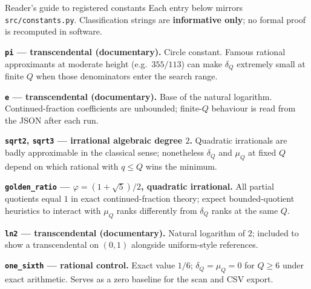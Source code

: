 \documentclass[
  ignorenonframetext,
]{beamer}
\author{\texorpdfstring{}{}}
\date{}
\begin{document}
\begin{frame}[fragile]{Reader's guide to registered constants}
\protect{}\label{readers-guide-to-registered-constants}
Each entry below mirrors \texttt{src/constants.py}. Classification
strings are \textbf{informative only}; no formal proof is recomputed in
software.

\textbf{\texttt{pi} --- transcendental (documentary).} Circle constant.
Famous rational approximants at moderate height (e.g.~\(355/113\)) can
make \(\delta_Q\) extremely small at finite \(Q\) when those
denominators enter the search range.

\textbf{\texttt{e} --- transcendental (documentary).} Base of the
natural logarithm. Continued-fraction coefficients are unbounded;
finite-\(Q\) behaviour is read from the JSON after each run.

\textbf{\texttt{sqrt2}, \texttt{sqrt3} --- irrational algebraic degree
\(2\).} Quadratic irrationals are badly approximable in the classical
sense; nonetheless \(\delta_Q\) and \(\mu_Q\) at fixed \(Q\) depend on
which rational with \(q\le Q\) wins the minimum.

\textbf{\texttt{golden\_ratio} --- \(\varphi=(1+\sqrt5)/2\), quadratic
irrational.} All partial quotients equal \(1\) in exact
continued-fraction theory; expect bounded-quotient heuristics to
interact with \(\mu_Q\) ranks differently from \(\delta_Q\) ranks at the
same \(Q\).

\textbf{\texttt{ln2} --- transcendental (documentary).} Natural
logarithm of \(2\); included to show a transcendental on \((0,1)\)
alongside uniform-style references.

\textbf{\texttt{one\_sixth} --- rational control.} Exact value \(1/6\);
\(\delta_Q=\mu_Q=0\) for \(Q\ge 6\) under exact arithmetic. Serves as a
zero baseline for the scan and CSV export.
\end{frame}
\end{document}
